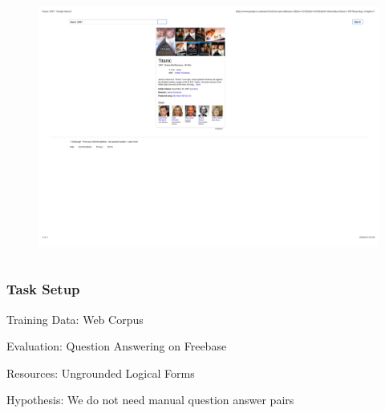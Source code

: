 \documentclass[mathserif,12pt]{beamer}
\newcommand{\hlight}[1]{{\color{blue!80} #1}}
\begin{document}
\begin{frame}
\begin{columns}
 \begin{column}{0.45\textwidth}
 \vspace{-3cm}
 \begin{figure}
  \includegraphics[scale=0.45]{figures/titanic} 
 \end{figure}
 \end{column}
\end{columns}
\end{frame}

\begin{frame}
 \frametitle{Task Setup}
 \large
 
 \hlight{Training Data:} Web Corpus
 
 \vspace{2em}
 \hlight{Evaluation:} Question Answering on Freebase
 
 \vspace{2em}
 \hlight{Resources:} Ungrounded Logical Forms
 
 \vspace{2em}
 \hlight{Hypothesis:} We do not need \hlight{manual} question answer pairs
\end{frame}
\end{document}
